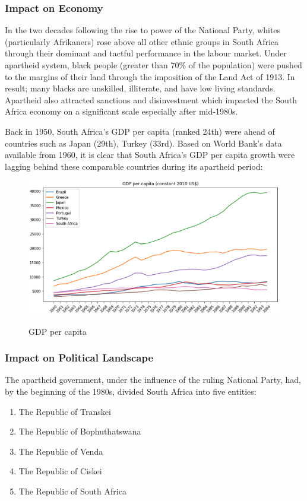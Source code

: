\documentclass{elsarticle}
\begin{document}
\subsubsection{Impact on Economy}
In the two decades following the rise to power of the National Party, whites (particularly Afrikaners) rose above all other ethnic groups in South Africa through their dominant and tactful performance in the labour market. Under apartheid system, black people (greater than 70\% of the population) were pushed to the margins of their land through the imposition of the Land Act of 1913. In result; many blacks are unskilled, illiterate, and have low living standards. Apartheid also attracted sanctions and disinvestment which impacted the South Africa economy on a significant scale especially after mid-1980s.

Back in 1950, South Africa's GDP per capita (ranked 24th) were ahead of countries such as Japan (29th), Turkey (33rd). Based on World Bank’s data available from 1960, it is clear that South Africa's GDP per capita growth were lagging behind these comparable countries during its apartheid period:

\begin{figure}[!h]
    \centering
    \includegraphics[width=1\textwidth]{images/GDP.jpg}
    \caption{GDP per capita}
    \label{fig:GDP per capita}
    \cite{GDP2019}
\end{figure}

\subsubsection{Impact on Political Landscape}
The apartheid government, under the influence of the ruling National Party, had, by the beginning of the 1980s, divided South Africa into five entities:

\begin{enumerate}
    \item The Republic of Transkei
    \item The Republic of Bophuthatswana
    \item The Republic of Venda
    \item The Republic of Ciskei
    \item The Republic of South Africa
\end{enumerate}
\end{document}
